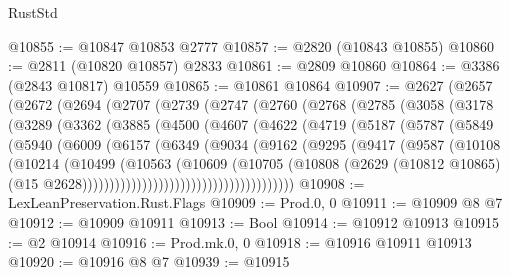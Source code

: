 \begin{lexlean}{RustStd}
\begin{coremodule}
{\begin{coremodule}
{{{{{{{{{{{{{{{{{{{{{{{{{{{{{{{{{@10855 := @10847 @10853 @2777
@10857 := @2820 (@10843 @10855)
@10860 := @2811 (@10820 @10857) @2833
@10861 := @2809 @10860
@10864 := @3386 (@2843 @10817) @10559
@10865 := @10861 @10864
@10907 := @2627
    (@2657
      (@2672
        (@2694
          (@2707
            (@2739
              (@2747
                (@2760
                  (@2768
                    (@2785
                      (@3058
                        (@3178
                          (@3289
                            (@3362
                              (@3885
                                (@4500
                                  (@4607
                                    (@4622
                                      (@4719
                                        (@5187
                                          (@5787
                                            (@5849
                                              (@5940
                                                (@6009
                                                  (@6157
                                                    (@6349
                                                      (@9034
                                                        (@9162
                                                          (@9295
                                                            (@9417
                                                              (@9587
                                                                (@10108
                                                                  (@10214
                                                                    (@10499
                                                                      (@10563
                                                                        (@10609
                                                                          (@10705
                                                                            (@10808
                                                                              (@2629
                                                                                (@10812 @10865)
                                                                                (@15
                                                                                  @2628)))))))))))))))))))))))))))))))))))))))
@10908 := LexLeanPreservation.Rust.Flags
@10909 := Prod.{0, 0}
@10911 := @10909 @8 @7
@10912 := @10909 @10911
@10913 := Bool
@10914 := @10912 @10913
@10915 := @2 @10914
@10916 := Prod.mk.{0, 0}
@10918 := @10916 @10911 @10913
@10920 := @10916 @8 @7
@10939 := @10915
}}}}}}}}}}}}}}}}}}}}}}}}}}}}}}}}}
\end{coremodule}}
\end{coremodule}
\end{lexlean}
